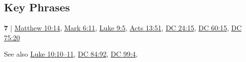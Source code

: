 	
		
		
\subsection{Key Phrases} %
	\label{DUST-PHRASES}

	\begin{compactdesc}
	
		\item[shaking dust off feet] \textbf{7} | \hyperref[MATTHEW-10-14]{Matthew 10:14}, \hyperref[MARK-6-11]{Mark 6:11}, \hyperref[LUKE-9-5]{Luke 9:5}, \hyperref[ACTS-13-51]{Acts 13:51}, \hyperref[DC24-15]{DC 24:15}, \hyperref[DC60-15]{DC 60:15}, \hyperref[DC75-20]{DC 75:20}
			\begin{compactdesc}
				\item[Commentary] See also \hyperref[LUKE-10-10]{Luke 10:10--11}, \hyperref[DC84-92]{DC 84:92}, \hyperref[DC99-4]{DC 99:4}, 
			\end{compactdesc}
			
	\end{compactdesc}
	


